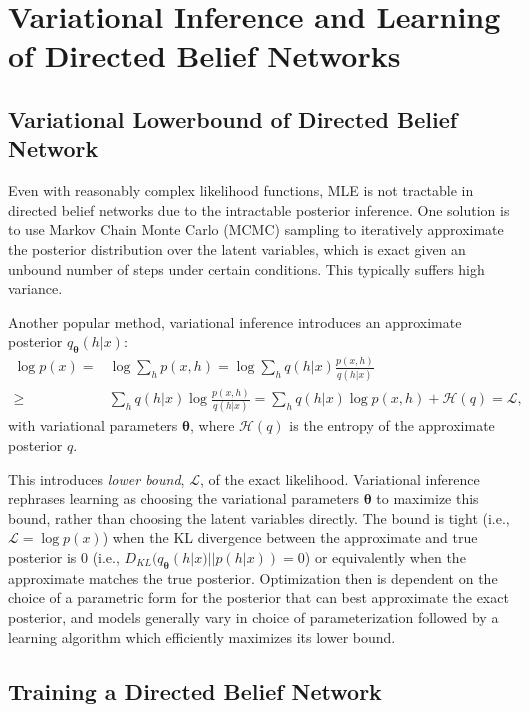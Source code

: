 \documentclass{article} %
\newcommand{\vects}[1]{\boldsymbol{#1}}
\newcommand{\TT}[0]{\vects{\theta}}
\newcommand{\LL}[0]{\mathcal{L}}
\newcommand{\HH}[0]{\mathcal{H}}
\begin{document}
\section{Variational Inference and Learning of Directed Belief Networks}
\subsection{Variational Lowerbound of Directed Belief Network}

Even with reasonably complex likelihood functions, MLE is not tractable in
directed belief networks due to the intractable posterior inference.  One
solution is to use Markov Chain Monte Carlo (MCMC) sampling to iteratively
approximate the posterior distribution over the latent variables, which is exact
given an unbound number of steps under certain conditions. This typically
suffers high variance. 

Another popular method, variational inference introduces an approximate
posterior $q_{\TT}(h|x)$:
\begin{align}
    \label{eq:approx_logp}
    \log p(x) =& \log \sum_{h} p(x, h) 
    = \log \sum_h q(h|x) \frac{p(x, h)}{q(h|x)} \nonumber \\
    \geq& \sum_h q(h|x) \log \frac{p(x, h)}{q(h|x)} 
    = \sum_h q(h|x) \log p(x,h) + \HH(q) = \LL,
\end{align}
with variational parameters $\TT$, where $\HH(q)$ is the entropy of the
approximate posterior $q$. 

This introduces \emph{lower bound}, $\LL$, of the exact likelihood. Variational
inference rephrases learning as choosing the variational parameters $\TT$ to
maximize this bound, rather than choosing the latent variables directly. The
bound is tight (i.e., $\LL = \log p(x)$) when the KL divergence between the
approximate and true posterior is $0$ (i.e., $D_{KL}(q_{\TT}(h|x)||p(h|x)) =
0$) or equivalently when the approximate matches the true posterior.
Optimization then is dependent on the choice of a parametric form for the
posterior that can best approximate the exact posterior, and models generally
vary in choice of parameterization followed by a learning algorithm which
efficiently maximizes its lower bound.

\subsection{Training a Directed Belief Network}
\end{document}
